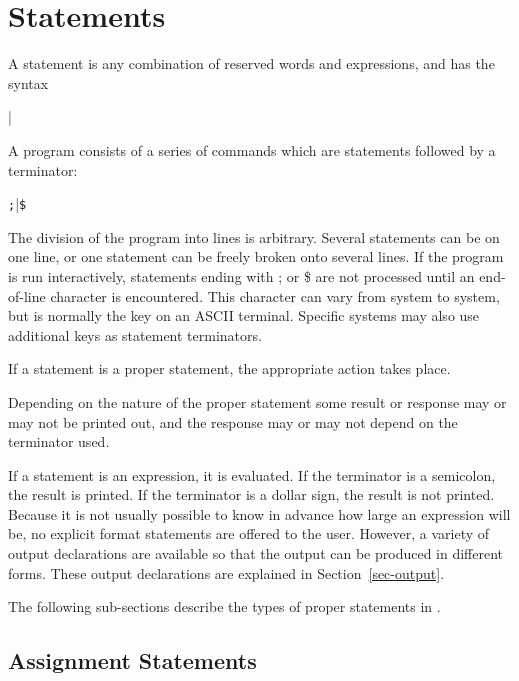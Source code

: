 \chapter{Statements}

A statement is any combination of reserved words and
expressions, and has the syntax 
\begin{syntax}
   \bnfprod {} | 
\end{syntax}
A {\REDUCE} program consists of a series of commands which are statements
followed by a terminator:
\begin{syntax}
         \bnfprod \texttt{;}|\texttt{\$}
\end{syntax}
The division of the program into lines is arbitrary. Several statements
can be on one line, or one statement can be freely broken onto several
lines. If the program is run interactively, statements ending with ; or \$
are not processed until an end-of-line character is encountered. This
character can vary from system to system, but is normally the 
key on an ASCII terminal.  Specific systems may also use additional keys
as statement terminators.

If a statement is a proper statement, the
appropriate action takes place.

Depending on the nature of the proper statement some result or response may
or may not be printed out, and the response may or may not depend on the
terminator used.

If a statement is an expression, it is evaluated. If the terminator is a
semicolon, the result is printed. If the terminator is a dollar sign, the
result is not printed. Because it is not usually possible to know in
advance how large an expression will be, no explicit format statements are
offered to the user. However, a variety of output declarations are
available so that the output can be produced in different forms. These
output declarations are explained in Section~\ref{sec-output}.

The following sub-sections describe the types of proper statements
 in {\REDUCE}.

\hypertarget{reserved:assignop}{\section{Assignment Statements}}

